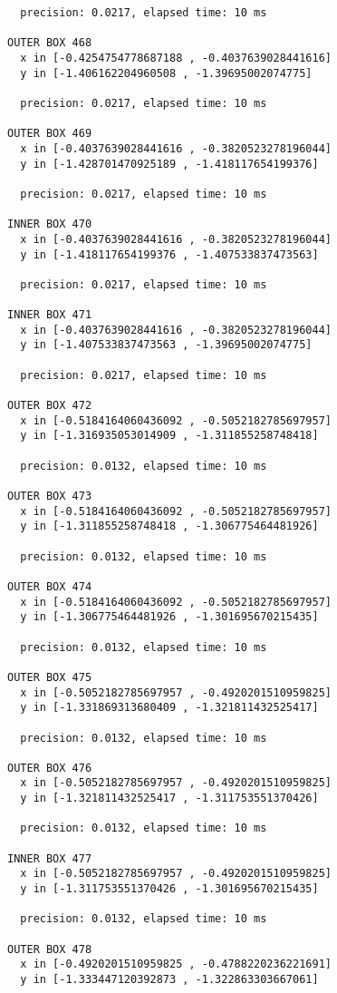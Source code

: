 \begin{verbatim}
  precision: 0.0217, elapsed time: 10 ms

OUTER BOX 468
  x in [-0.4254754778687188 , -0.4037639028441616]
  y in [-1.406162204960508 , -1.39695002074775]

  precision: 0.0217, elapsed time: 10 ms

OUTER BOX 469
  x in [-0.4037639028441616 , -0.3820523278196044]
  y in [-1.428701470925189 , -1.418117654199376]

  precision: 0.0217, elapsed time: 10 ms

INNER BOX 470
  x in [-0.4037639028441616 , -0.3820523278196044]
  y in [-1.418117654199376 , -1.407533837473563]

  precision: 0.0217, elapsed time: 10 ms

INNER BOX 471
  x in [-0.4037639028441616 , -0.3820523278196044]
  y in [-1.407533837473563 , -1.39695002074775]

  precision: 0.0217, elapsed time: 10 ms

OUTER BOX 472
  x in [-0.5184164060436092 , -0.5052182785697957]
  y in [-1.316935053014909 , -1.311855258748418]

  precision: 0.0132, elapsed time: 10 ms

OUTER BOX 473
  x in [-0.5184164060436092 , -0.5052182785697957]
  y in [-1.311855258748418 , -1.306775464481926]

  precision: 0.0132, elapsed time: 10 ms

OUTER BOX 474
  x in [-0.5184164060436092 , -0.5052182785697957]
  y in [-1.306775464481926 , -1.301695670215435]

  precision: 0.0132, elapsed time: 10 ms

OUTER BOX 475
  x in [-0.5052182785697957 , -0.4920201510959825]
  y in [-1.331869313680409 , -1.321811432525417]

  precision: 0.0132, elapsed time: 10 ms

OUTER BOX 476
  x in [-0.5052182785697957 , -0.4920201510959825]
  y in [-1.321811432525417 , -1.311753551370426]

  precision: 0.0132, elapsed time: 10 ms

INNER BOX 477
  x in [-0.5052182785697957 , -0.4920201510959825]
  y in [-1.311753551370426 , -1.301695670215435]

  precision: 0.0132, elapsed time: 10 ms

OUTER BOX 478
  x in [-0.4920201510959825 , -0.4788220236221691]
  y in [-1.333447120392873 , -1.322863303667061]


\end{verbatim}
